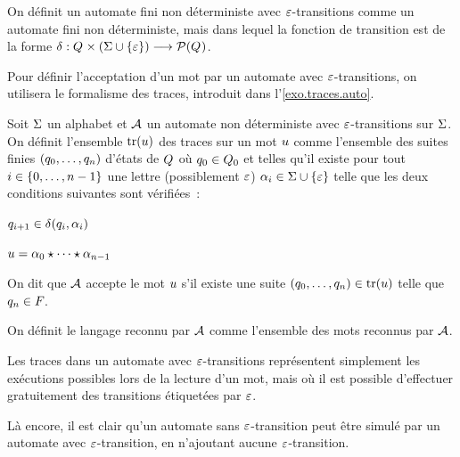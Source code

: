\begin{definition}
  On définit un automate fini non déterministe avec $\varepsilon$-transitions comme un
  automate fini non déterministe, mais dans lequel la fonction de transition est
  de la forme
  $\delta_{} : \displaystyle Q_{}\times(\Sigma \cup \{\varepsilon\}) \longrightarrow \mathcal{P}(Q_{})$.
\end{definition}

Pour définir l'acceptation d'un mot par un automate avec $\varepsilon$-transitions, on
utilisera le formalisme des traces, introduit dans l'\cref{exo.traces.auto}.

\begin{definition}
  Soit $\Sigma$ un alphabet et $\mathcal{A}$ un automate non déterministe avec
  $\varepsilon$-transitions sur $\Sigma$. On définit l'ensemble $\operatorname{tr}(u)$ des
  traces sur un mot $u$ comme l'ensemble des suites finies
  $(q_{0},\ldots,q_{n})$ d'états de $Q_{}$ où $q_{0} \in Q_{0}$ et
  telles qu'il existe pour tout $i \in \{0,\ldots,n - 1\}$ une lettre (possiblement
  $\varepsilon$) $\alpha_i \in \Sigma\cup\{\varepsilon\}$ telle que les deux conditions
  suivantes sont vérifiées~:
  \begin{itemize}
    \begin{minipage}{0.45\textwidth}
    \item $q_{i+1} \in \delta_{}(q_{i},\alpha_i)$
    \end{minipage}
    \begin{minipage}{0.45\textwidth}
    \item $u = \alpha_0\mathbin{\star}\cdots\mathbin{\star} \alpha_{n-1}$
    \end{minipage}
  \end{itemize}
  On dit que $\mathcal{A}$ accepte le mot $u$ s'il existe une suite
  $(q_{0},\ldots,q_{n}) \in \operatorname{tr}(u)$ telle que $q_{n} \in F_{}$.

  On définit le langage reconnu par $\mathcal{A}$ comme l'ensemble des mots reconnus
  par $\mathcal{A}$.
\end{definition}

Les traces dans un automate avec $\varepsilon$-transitions représentent simplement les
exécutions possibles lors de la lecture d'un mot, mais où il est possible
d'effectuer gratuitement des transitions étiquetées par $\varepsilon$.

Là encore, il est clair qu'un automate sans $\varepsilon$-transition peut être simulé
par un automate avec $\varepsilon$-transition, en n'ajoutant aucune $\varepsilon$-transition.

